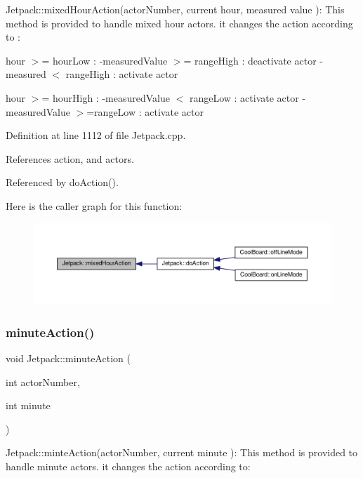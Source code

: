 Jetpack\+::mixed\+Hour\+Action(actor\+Number, current hour, measured value )\+: This method is provided to handle mixed hour actors. it changes the action according to \+:

hour $>$= hour\+Low \+: -\/measured\+Value $>$= range\+High \+: deactivate actor -\/measured $<$ range\+High \+: activate actor

hour $>$= hour\+High \+: -\/measured\+Value $<$ range\+Low \+: activate actor -\/measured\+Value $>$=range\+Low \+: activate actor 

Definition at line 1112 of file Jetpack.\+cpp.



References action, and actors.



Referenced by do\+Action().

Here is the caller graph for this function\+:
\nopagebreak
\begin{figure}[H]
\begin{center}
\leavevmode
\includegraphics[width=350pt]{df/d1d/class_jetpack_ac1a49ab4867718cdb415ad74c2066b9d_icgraph}
\end{center}
\end{figure}
\mbox{\label{class_jetpack_a97da41141c7b53ddee61143519c8d17d}} 
\subsubsection{\texorpdfstring{minute\+Action()}{minuteAction()}}
{\footnotesize\ttfamily void Jetpack\+::minute\+Action (\begin{DoxyParamCaption}\item[{int}]{actor\+Number,  }\item[{int}]{minute }\end{DoxyParamCaption})}

Jetpack\+::minte\+Action(actor\+Number, current minute )\+: This method is provided to handle minute actors. it changes the action according to\+:

